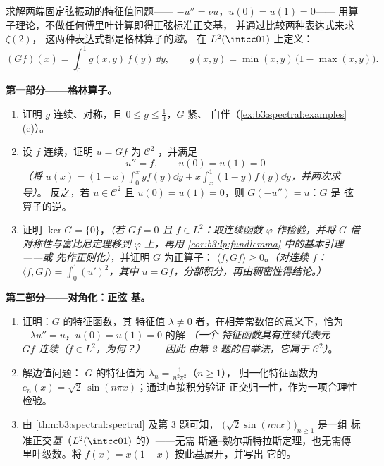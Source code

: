 \begin{problem}\label{pb:b3:spectral:1}
求解两端固定弦振动的特征值问题——
$-u'' = \nu u$，$u(0) = u(1) = 0$——
用算子理论，不做任何傅里叶计算即得正弦标准正交基，
并通过比较两种表达式来求 $\zeta(2)$，
这两种表达式都是格林算子的\emph{迹}。
在 $L^2(\intcc01)$ 上定义：
\[
(Gf)(x) = \int_0^1 g(x,y)\,f(y)\,\dd y,
\qquad
g(x, y) = \min(x,y)\,\bigl(1 - \max(x,y)\bigr).
\]

\medskip
\noindent\textbf{第一部分——格林算子。}
\begin{enumerate}
  \item 证明 $g$ 连续、对称，且 $0 \leq g
        \leq \frac14$，$G$ 紧、
        自伴（\cref{ex:b3:spectral:examples}(c)）。
  \item 设 $f$ 连续，证明 $u = Gf$ 为 $\mathcal
        C^2$ ，并满足
        \[
        -u'' = f, \qquad u(0) = u(1) = 0
        \]
        \emph{（将 $u(x) = (1-x)\int_0^xyf(y)\dd y +
        x\int_x^1(1-y)f(y)\dd y$，并两次求导）}。
        反之，若 $u \in \mathcal C^2$ 且 $u(0) = u(1)
        = 0$，则 $G(-u'') = u$：$G$ 是
        弦算子的逆。
  \item 证明 $\ker G = \{0\}$，\emph{（若 $Gf = 0$ 且 $f \in
        L^2$：取连续函数 $\varphi$ 作检验，并将 $G$
        借对称性与富比尼定理移到 $\varphi$ 上，再用
        \cref{cor:b3:lp:fundlemma} 中的基本引理——或
        先作正则化）}，并证明 $G$ 为正算子：
        $\langle f, Gf\rangle \geq 0$。\emph{（对连续
        $f$：$\langle f, Gf\rangle = \int_0^1 (u')^2$，其中 $u
        = Gf$，分部积分，再由稠密性得结论。）}
\end{enumerate}

\medskip
\noindent\textbf{第二部分——对角化：正弦
基。}
\begin{enumerate}[resume]
  \item 证明：$G$ 的特征函数，其
        特征值 $\lambda \ne 0$ 者，在相差常数倍的意义下，恰为
        $-\lambda u'' = u$，$u(0) = u(1) = 0$ 的解 \emph{（一个
        特征函数具有连续代表元——$Gf$
        连续（$f \in L^2$，为何？）——因此
        由第 2 题的自举法，它属于 $\mathcal C^2$）}。
  \item 解边值问题：
        $G$ 的特征值为 $\lambda_n = \frac1{n^2\pi^2}$（$n \geq 1$），
        归一化特征函数为 $e_n(x) =
        \sqrt2\,\sin(n\pi x)$；通过直接积分验证
        正交归一性，作为一项合理性检验。
  \item 由
        \cref{thm:b3:spectral:spectral} 及第 3 题可知，
        $\bigl(\sqrt2\sin(n\pi x)\bigr)_{n\geq1}$ 是一组
        标准正交\emph{基}（$L^2(\intcc01)$ 的）——无需
        斯通–魏尔斯特拉斯定理，也无需傅里叶级数。将
        $f(x) = x(1-x)$ 按此基展开，并写出
        它的。
\end{enumerate}


\end{problem}
